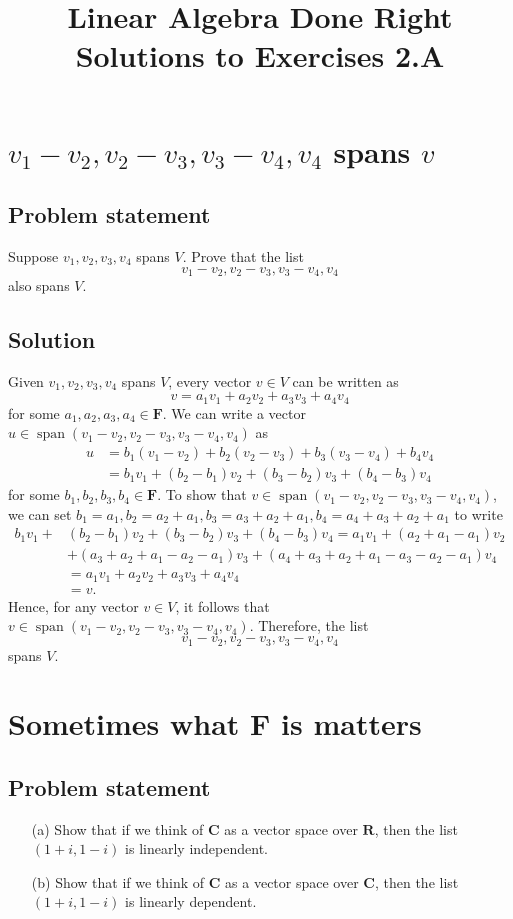 \documentclass{article}
\title{Linear Algebra Done Right\\Solutions to Exercises 2.A}
\author{}
\date{}
\begin{document}
\maketitle

\section{$v_1-v_2,v_2-v_3,v_3-v_4,v_4$ spans $v$}
\subsection*{Problem statement}
Suppose $v_1,v_2,v_3,v_4$ spans $V$. 
Prove that the list
\[v_1-v_2,v_2-v_3,v_3-v_4,v_4\]
also spans $V$.

\subsection*{Solution}
Given $v_1,v_2,v_3,v_4$ spans $V$, every vector $v\in V$ can be written as 
\[v=a_1v_1+a_2v_2+a_3v_3+a_4v_4\]
for some $a_1,a_2,a_3,a_4\in\mathbf{F}$. 
We can write a vector\newline $u\in\operatorname{span}(v_1-v_2,v_2-v_3,v_3-v_4,v_4)$ as
\begin{align*}
    u&=b_1(v_1-v_2)+b_2(v_2-v_3)+b_3(v_3-v_4)+b_4v_4\\
    &=b_1v_1+(b_2-b_1)v_2+(b_3-b_2)v_3+(b_4-b_3)v_4
\end{align*}
for some $b_1,b_2,b_3,b_4\in\mathbf{F}$. 
To show that $v\in\operatorname{span}(v_1-v_2,v_2-v_3,v_3-v_4,v_4)$, we can set $b_1=a_1,b_2=a_2+a_1,b_3=a_3+a_2+a_1,b_4=a_4+a_3+a_2+a_1$ to write
\begin{align*}
    b_1v_1+&(b_2-b_1)v_2+(b_3-b_2)v_3+(b_4-b_3)v_4=a_1v_1+(a_2+a_1-a_1)v_2\\
    &+(a_3+a_2+a_1-a_2-a_1)v_3+(a_4+a_3+a_2+a_1-a_3-a_2-a_1)v_4\\
    &=a_1v_1+a_2v_2+a_3v_3+a_4v_4\\
    &=v.
\end{align*}
Hence, for any vector $v\in V$, it follows that $v\in\operatorname{span}(v_1-v_2,v_2-v_3,v_3-v_4,v_4)$. 
Therefore, the list
\[v_1-v_2,v_2-v_3,v_3-v_4,v_4\]
spans $V$. 

\clearpage

\renewcommand{\thesection}{5}
\section{Sometimes what $\mathbf{F}$ is matters}
\subsection*{Problem statement}
\begin{enumerate}
    \item[(a)] Show that if we think of $\mathbf{C}$ as a vector space over $\mathbf{R}$, then the list $(1+i,1-i)$ is linearly independent.
    \item[(b)] Show that if we think of $\mathbf{C}$ as a vector space over $\mathbf{C}$, then the list $(1+i,1-i)$ is linearly dependent.
\end{enumerate}
\end{document}

